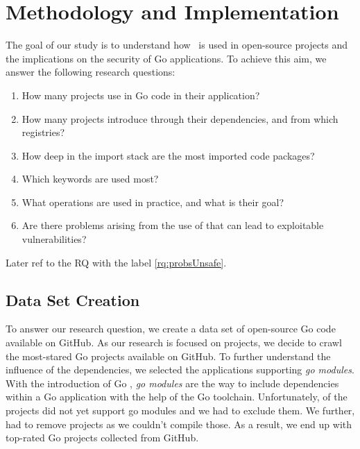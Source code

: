 \section{Methodology and Implementation}
\label{sec:impl}

The goal of our study is to understand how \unsafe{}~is used in open-source projects and the implications on the security of Go applications. 
To achieve this aim, we answer the following research questions:

\begin{enumerate}[label={RQ\arabic*},leftmargin=*] 
    \item How many projects use \unsafe{} in Go code in their application? \label{rq:prevalApp}
    \item How many projects introduce \unsafe{} through their dependencies, and from which registries? \label{rq:prevalDeps}
    \item How deep in the import stack are the most imported \unsafe{} code packages? \label{rq:depsDepth}
    \item Which \unsafe{} keywords are used most? \label{rq:distTypes}
    \item What \unsafe{} operations are used in practice, and what is their goal? \label{rq:purpose}
    \item Are there problems arising from the use of \unsafe{} that can lead to exploitable vulnerabilities? \label{rq:probsUnsafe}
\end{enumerate}

Later ref to the RQ with the label \ref{rq:probsUnsafe}.

\subsection{Data Set Creation}

To answer our research question, we create a data set of open-source Go code available on GitHub.
As our research is focused on projects, we decide to crawl the \initalProjs{} most-stared Go projects available on GitHub. 
To further understand the influence of the dependencies, we selected the applications supporting \textit{go modules}.
With the introduction of Go , \textit{go modules} are the way to include dependencies within a Go application with the help of the Go toolchain. 
Unfortunately, \withoutModules{} of the projects did not yet support go modules and we had to exclude them.
We further, had to remove \notCompiled{} projects as we couldn't compile those.
As a result, we end up with \projsAnalyzed{} top-rated Go projects collected from GitHub. 




